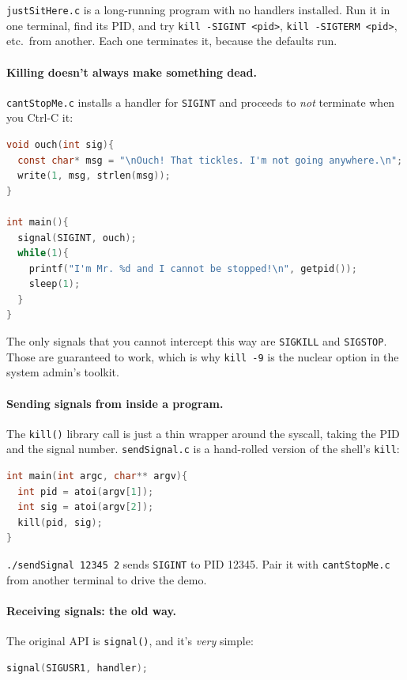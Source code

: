 \documentclass[11pt]{article}
\begin{document}
\texttt{justSitHere.c} is a long-running program with no handlers
installed. Run it in one terminal, find its PID, and try
\texttt{kill -SIGINT <pid>}, \texttt{kill -SIGTERM <pid>}, etc.\ from
another. Each one terminates it, because the defaults run.

\paragraph{Killing doesn't always make something dead.}
\texttt{cantStopMe.c} installs a handler for \texttt{SIGINT} and
proceeds to \emph{not} terminate when you Ctrl-C it:

\begin{lstlisting}[language=C]
void ouch(int sig){
  const char* msg = "\nOuch! That tickles. I'm not going anywhere.\n";
  write(1, msg, strlen(msg));
}

int main(){
  signal(SIGINT, ouch);
  while(1){
    printf("I'm Mr. %d and I cannot be stopped!\n", getpid());
    sleep(1);
  }
}
\end{lstlisting}

The only signals that you cannot intercept this way are
\texttt{SIGKILL} and \texttt{SIGSTOP}. Those are guaranteed to work,
which is why \texttt{kill -9} is the nuclear option in the system
admin's toolkit.

\paragraph{Sending signals from inside a program.} The
\texttt{kill()} library call is just a thin wrapper around the
syscall, taking the PID and the signal number. \texttt{sendSignal.c}
is a hand-rolled version of the shell's \texttt{kill}:

\begin{lstlisting}[language=C]
int main(int argc, char** argv){
  int pid = atoi(argv[1]);
  int sig = atoi(argv[2]);
  kill(pid, sig);
}
\end{lstlisting}

\texttt{./sendSignal 12345 2} sends \texttt{SIGINT} to PID 12345.
Pair it with \texttt{cantStopMe.c} from another terminal to drive the
demo.

\paragraph{Receiving signals: the old way.} The original API is
\texttt{signal()}, and it's \emph{very} simple:

\begin{lstlisting}[language=C]
signal(SIGUSR1, handler);
\end{lstlisting}
\end{document}
